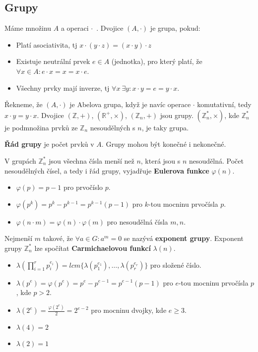 \documentclass[10pt,a4paper]{article}
\begin{document}
\subsection{Grupy}
Máme množinu $A$ a operaci $\cdot$~. Dvojice $(A,\cdot)$ je grupa, pokud:
\begin{itemize}
\item Platí asociativita, tj $x\cdot(y\cdot z) = (x\cdot y)\cdot z$
\item Existuje neutrální prvek $e \in A$ (jednotka), pro který platí, že
$\forall x \in A: e\cdot x = x = x \cdot e$.
\item Všechny prvky mají inverze, tj $\forall x ~\exists y: x\cdot y = e = y
\cdot x$.
\end{itemize}
Řekneme, že $(A,\cdot)$ je Abelova grupa, když je navíc operace $\cdot$
komutativní, tedy $x\cdot y = y \cdot x$. Dvojice $(\mathbb{Z}, +)$,
$(\mathbb{R}^+, \times)$,  $(\mathbb{Z}_n, +)$ jsou grupy. $(\mathbb{Z}_n^*,
\times)$, kde $\mathbb{Z}_n^*$ je podmnožina prvků ze $\mathbb{Z}_n$
nesoudělných s $n$, je taky grupa.

\textbf{Řád grupy} je počet prvků v $A$. Grupy mohou být konečné i nekonečné.

V grupách $\mathbb{Z}_n^*$ jsou všechna čísla menší než $n$, která jsou s $n$
nesoudělná. Počet nesoudělných čísel, a tedy i řád grupy, vyjadřuje
\textbf{Eulerova funkce} $\varphi(n)$.
\begin{itemize}
\item $\varphi(p) = p-1$ pro prvočíslo $p$.
\item $\varphi(p^k) = p^k - p^{k-1} = p^{k-1}(p-1)$ pro $k$-tou mocninu
prvočísla $p$.
\item $\varphi(n\cdot m) = \varphi(n)\cdot\varphi(m)$ pro nesoudělná čísla
$m,n$.
\end{itemize}

Nejmenší $m$ takové, že $\forall a \in G: a^m = 0$ se nazývá \textbf{exponent
grupy}. Exponent grupy $\mathbb{Z}_n^*$ lze spočítat \textbf{Carmichaelovou
funkcí} $\lambda(n)$.
\begin{itemize}
\item $\lambda(\prod_{i=1}^r p_i^{e_i}) = lcm\{\lambda(p_1^{e_1}), \ldots,
\lambda(p_r^{e_r})\}$ pro složené číslo.
\item $\lambda(p^e) = \varphi(p^e) = p^e - p^{e-1} = p^{e-1}(p-1)$ pro $e$-tou
mocninu prvočísla $p$, kde $p > 2$.
\item $\lambda(2^e) = \frac{\varphi(2^e)}{2} = 2^{e - 2}$ pro mocninu dvojky,
kde $e \geq 3$.
\item $\lambda(4) = 2$
\item $\lambda(2) = 1$
\end{itemize}
\end{document}
